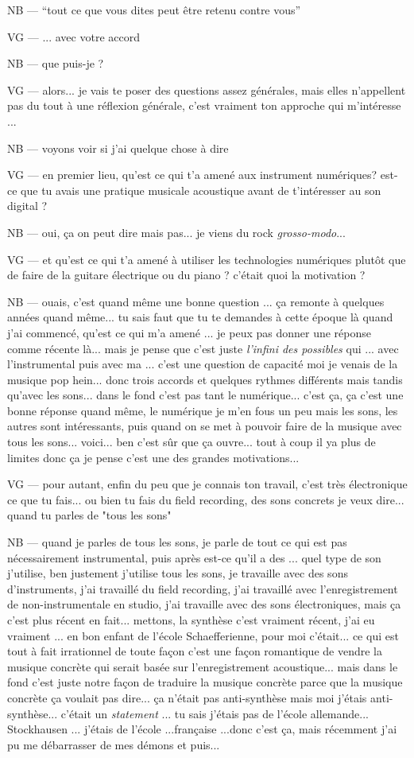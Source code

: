 NB — ``tout ce que vous dites peut être retenu contre vous'' 

VG — ... avec votre accord 

NB — que puis-je ?

VG — alors... je vais te poser des questions assez générales, mais elles n'appellent pas du tout à une réflexion générale, c'est vraiment ton approche qui m'intéresse ... 

NB — voyons voir si j'ai quelque chose à dire 

VG — en premier lieu, qu'est ce qui t'a amené aux instrument numériques? est-ce que tu avais une pratique musicale acoustique avant de t'intéresser au son digital ?

NB — oui, ça on peut dire mais pas... je viens du rock \textit{grosso-modo}... 

VG — et qu'est ce qui t'a amené à utiliser les technologies numériques plutôt que de faire de la guitare électrique ou du piano ? c'était quoi la motivation ?

NB — ouais, c'est quand même une bonne question ... ça remonte à quelques années quand même... tu sais faut que tu te demandes à cette époque là quand j'ai commencé, qu'est ce qui m'a amené ... je peux pas donner une réponse comme récente là... mais je pense que c'est juste \textit{l'infini des possibles} qui ... avec l'instrumental puis avec ma ... c'est une question de capacité moi je venais de la musique pop hein... donc trois accords et quelques rythmes différents mais tandis qu'avec les sons... dans le fond c'est pas tant le numérique... c'est ça, ça c'est une bonne réponse quand même, le numérique je m'en fous un peu mais les sons, les autres sont intéressants, puis quand on se met à pouvoir faire de la musique avec tous les sons... voici... ben c'est sûr que ça ouvre... tout à coup il ya plus de limites donc ça je pense c'est une des grandes motivations... 

VG — pour autant, enfin du peu que je connais ton travail, c'est très électronique ce que tu fais... ou bien tu fais du field recording, des sons concrets je veux dire... quand tu parles de "tous les sons"

NB — quand je parles de tous les sons, je parle de tout ce qui est pas nécessairement instrumental, puis après est-ce qu'il a des ... quel type de son j'utilise, ben justement j'utilise tous les sons, je travaille avec des sons d'instruments, j'ai travaillé du field recording, j'ai travaillé avec l'enregistrement de non-instrumentale en studio, j'ai travaille avec des sons électroniques, mais ça c'est plus récent en fait... mettons, la synthèse c'est vraiment récent, j'ai eu vraiment ... en bon enfant de l'école Schaefferienne, pour moi c'était... ce qui est tout à fait irrationnel de toute façon c'est une façon romantique de vendre la musique concrète qui serait basée sur l'enregistrement acoustique... mais dans le fond c'est juste notre façon de traduire la musique concrète parce que la musique concrète ça voulait pas dire... ça n'était pas anti-synthèse mais moi j'étais anti-synthèse... c'était un \textit{statement} ... tu sais j'étais pas de l'école allemande... Stockhausen ... j'étais de l'école ...française ...donc c'est ça, mais récemment j'ai pu me débarrasser de mes démons et puis...

